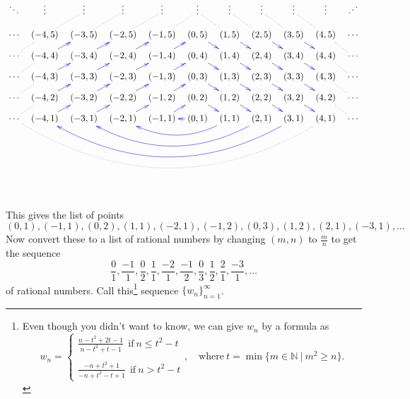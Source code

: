\documentclass[12pt]{amsart}
\newcommand{\N}{\mathbb{N}}
\begin{document}
\begin{center}
\[{\xymatrix@C=.7em@R=.7em{ 
\ddots & \vdots & \vdots &  \vdots & \vdots & \vdots \ar@{.}@[blue][dr]& \vdots \ar@{.}@[blue][dr]& \vdots \ar@{.}@[blue][dr]& \vdots \ar@{.}@[blue][dr]&  \vdots & \reflectbox{$\ddots$} \\
\cdots & (-4,5) \ar@{.}@[blue][ur]& (-3,5) \ar@{.}@[blue][ur]& (-2,5) \ar@{.}@[blue][ur]& (-1,5) \ar@{.}@[blue][ur]& (0,5) \ar@{->}@[blue][dr]
& (1,5) \ar@{->}@[blue][dr]& (2,5) \ar@{->}@[blue][dr]& (3,5) \ar@{->}@[blue][dr]& (4,5)\ar@{.}@[blue][dr] & \cdots \\
\cdots \ar@{.}@[blue][ur]& (-4,4) \ar@{->}@[blue][ur]& (-3,4) \ar@{->}@[blue][ur]& (-2,4) \ar@{->}@[blue][ur]& (-1,4) \ar@{->}@[blue][ur]& (0,4) \ar@{->}@[blue][dr]
& (1,4) \ar@{->}@[blue][dr]& (2,4) \ar@{->}@[blue][dr]& (3,4) \ar@{->}@[blue][dr]& (4,4) \ar@{.}@[blue][dr]& \cdots \\
\cdots \ar@{.}@[blue][ur]& (-4,3) \ar@{->}@[blue][ur]& (-3,3) \ar@{->}@[blue][ur]& (-2,3) \ar@{->}@[blue][ur]& (-1,3) \ar@{->}@[blue][ur]& (0,3) \ar@{->}@[blue][dr]
& (1,3) \ar@{->}@[blue][dr]& (2,3) \ar@{->}@[blue][dr]& (3,3) \ar@{->}@[blue][dr]& (4,3) \ar@{.}@[blue][dr]& \cdots \\
\cdots \ar@{.}@[blue][ur]& (-4,2) \ar@{->}@[blue][ur]& (-3,2) \ar@{->}@[blue][ur]& (-2,2) \ar@{->}@[blue][ur]& (-1,2) \ar@{->}@[blue][ur] & (0,2) \ar@{->}@[blue][dr]
& (1,2) \ar@{->}@[blue][dr] & (2,2) \ar@{->}@[blue][dr]& (3,2) \ar@{->}@[blue][dr]& (4,2) \ar@{.}@[blue][dr]& \cdots \\
\cdots \ar@{.}@[blue][ur] & (-4,1) \ar@{->}@[blue][ur]& (-3,1) \ar@{->}@[blue][ur] & (-2,1) \ar@{->}@[blue][ur]& (-1,1) \ar@{->}@[blue][ur]& (0,1) \ar@{->}@[blue][l]
& (1,1) \ar@/^1.5pc/@[blue][lll]& (2,1) \ar@/^2.5pc/@[blue][lllll] & (3,1) \ar@/^3.5pc/@[blue][lllllll] & (4,1)  \ar@{.}@/^4.5pc/@[blue][lllllllll]& \cdots \\
 }}\]
 \end{center}
 
 \
 
 \
 
 \
 
	
\noindent	This gives the list of points
	$$
	(0,1),  (-1,1), (0,2), (1,1), (-2,1), (-1,2), (0,3), (1,2), (2,1), (-3,1), \dots
	$$
	Now convert these to a list of rational numbers by changing $(m,n)$ to $\frac{m}{n}$ to get the sequence
	$$
	\frac01, \frac{-1}1, \frac02, \frac11, \frac{-2}1, \frac{-1}2, \frac03, \frac12, \frac21, \frac{-3}1, \dots
	$$
	of rational numbers.  Call this\footnote{Even though you didn't want to know, we can give $w_n$ by a formula as
	\[ w_n = \displaystyle \begin{cases} \displaystyle \frac{n-t^2 + 2t - 1}{n-t^2 + t -1} \ \ \text{if} \ n\leq t^2 - t \\ \\  \displaystyle \frac{-n+t^2 + 1}{-n+t^2 - t +1} \ \ \text{if} \ n> t^2 - t\end{cases}, \quad \text{where} \ t=\min\{ m\in \N \ | \ m^2 \geq n\}.\]}
	sequence $\{ w_n\}_{n=1}^\infty$.
\end{document}
